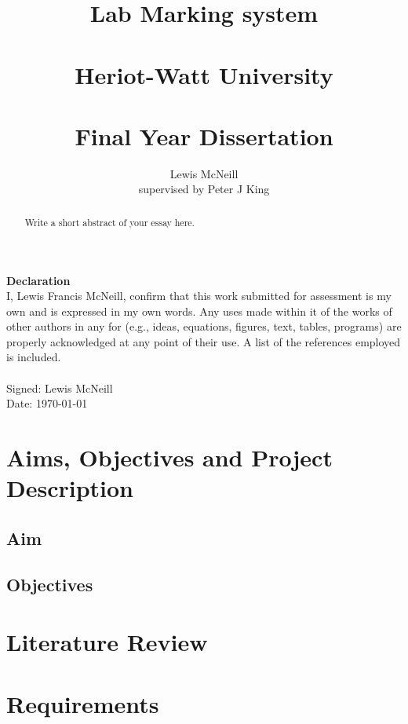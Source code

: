 \documentclass[12pt]{article}  %
\title{Lab Marking system \\~\\  \large{Heriot-Watt University} \\~\\ Final Year Dissertation}
\author{Lewis McNeill\\
supervised by
Peter J King}
\theoremstyle{definition}
\theoremstyle{remark}
\begin{document}
\maketitle

\newpage 

\textbf{\Large{Declaration}} \\[2em]
I, Lewis Francis McNeill, confirm that this work submitted for assessment is my own and is expressed in my own words. Any uses made within it of the works of other authors in any for (e.g., ideas, equations, figures, text, tables, programs) are properly acknowledged at any point of their use. A list of the references employed is included.
\\
\\
Signed: Lewis McNeill
\\
Date: \today

\newpage                     %
\begin{abstract}

Write a short abstract of your essay here.



\end{abstract}

\newpage                     %
\tableofcontents




\newpage                     %
\section{Aims, Objectives and Project Description}

\subsection{Aim}

\subsection{Objectives}






\newpage
\section{Literature Review}





\newpage
\section{Requirements}
\end{document}
